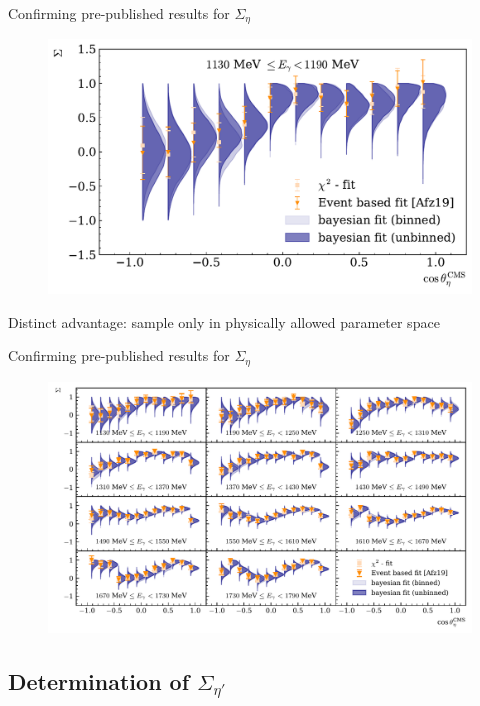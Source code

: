 \documentclass[11pt,aspectratio=169,dvipsnames]{beamer}
\begin{document}
\begin{frame}{Confirming pre-published results for $\Sigma_\eta$}
	\begin{figure}
		\centering
		\includegraphics[width=.8\linewidth]{../../bayes/event_based_fit/plots/sigma_eta_bin.pdf}
	\end{figure}
	Distinct advantage: sample only in physically allowed parameter space
\end{frame}
	\begin{frame}{Confirming pre-published results for $\Sigma_\eta$}
		\begin{figure}
			\centering
			\includegraphics[width=.95\linewidth]{../../bayes/event_based_fit/plots/sigma_eta.pdf}
		\end{figure}
	\end{frame}
	
	
	
	
	\subsection{Determination of $\Sigma_{\eta'}$}
	
\end{document}
